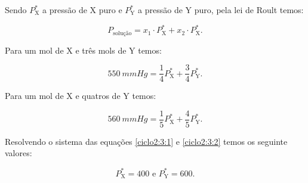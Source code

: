 Sendo $P^*_{\text{X}}$ a pressão de X puro e $P^*_{\text{Y}}$ a pressão de Y puro, pela lei de Roult temos:

\begin{equation}
P_{\text{solução}} = x_1 \cdot  P^*_{\text{X}} + x_2 \cdot P^*_{\text{X}}.
\end{equation} 

Para um mol de X e três mols de Y temos:

\begin{equation}\label{ciclo2:3:1}
	\SI{550}{mmHg} = \frac{1}{4}P^*_{\text{X}} + \frac{3}{4}P^*_{\text{Y}}.
\end{equation}

Para um mol de X e quatros de Y temos:

\begin{equation}\label{ciclo2:3:2}
	\SI{560}{mmHg} = \frac{1}{5}P^*_{\text{X}} + \frac{4}{5}P^*_{\text{Y}}.
\end{equation}

Resolvendo o sistema das equações \ref{ciclo2:3:1} e \ref{ciclo2:3:2} temos os seguinte valores:

$$ P^*_{\text{X}} = 400 \text{ e } P^*_{\text{Y}} = 600.$$
